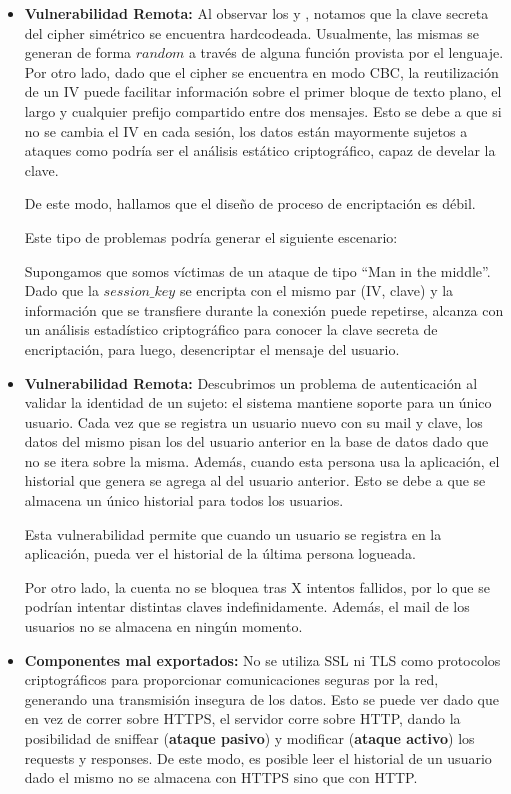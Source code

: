\documentclass[10pt, a4paper]{article}
\begin{document}
\begin{itemize}

\item \textbf{Vulnerabilidad Remota:} Al observar los  y , notamos que la clave secreta del cipher simétrico se encuentra hardcodeada. Usualmente, las mismas se generan de forma $random$ a través de alguna función provista por el lenguaje. 
Por otro lado, dado que el cipher se encuentra en modo CBC, la reutilización de un IV puede facilitar información sobre el primer bloque de texto plano, el largo y cualquier prefijo compartido entre dos mensajes.
Esto se debe a que si no se cambia el IV en cada sesión, los datos están mayormente sujetos a ataques como podría ser el análisis estático criptográfico, capaz de develar la clave. 

De este modo, hallamos que el diseño de proceso de encriptación es débil.

Este tipo de problemas podría generar el siguiente escenario:

Supongamos que somos víctimas de un ataque de tipo ``Man in the middle''. Dado que la $session\_key$ se encripta con el mismo par (IV, clave) y la información que se transfiere durante la conexión puede repetirse, alcanza con un análisis estadístico criptográfico para conocer la clave secreta de encriptación, para luego, desencriptar el mensaje del usuario.

\item \textbf{Vulnerabilidad Remota:} Descubrimos un problema de autenticación al validar la identidad de un sujeto: el sistema mantiene soporte para un único usuario. Cada vez que se registra un usuario nuevo con su mail y clave, los datos del mismo pisan los del usuario anterior en la base de datos dado que no se itera sobre la misma. Además, cuando esta persona usa la aplicación, el historial que genera se agrega al del usuario anterior. Esto se debe a que se almacena un único historial para todos los usuarios.

Esta vulnerabilidad permite que cuando un usuario se registra en la aplicación, pueda ver el historial de la última persona logueada.

Por otro lado, la cuenta no se bloquea tras X intentos fallidos, por lo que se podrían intentar distintas claves indefinidamente. Además, el mail de los usuarios no se almacena en ningún momento. 

\item \textbf{Componentes mal exportados:} No se utiliza SSL ni TLS como protocolos criptográficos para proporcionar comunicaciones seguras por la red, generando una transmisión insegura de los datos. Esto se puede ver dado que en vez de correr sobre HTTPS, el servidor corre sobre HTTP, dando la posibilidad de sniffear (\textbf{ataque pasivo}) y modificar (\textbf{ataque activo}) los requests y responses. De este modo, es posible leer el historial de un usuario dado el mismo no se almacena con HTTPS sino que con HTTP. 


\end{itemize}
\end{document}
